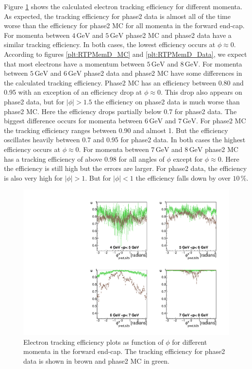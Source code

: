 \documentclass[a4paper,11pt,twosided,final,german,openbib,pdftex,listof=totoc,bibliography=totoc]{scrbook}
\begin{document}
Figure \ref{plt:xPMPhiemFC} shows the calculated electron tracking efficiency for different momenta. As expected, the tracking efficiency for phase2 data is almost all of the time worse than the efficiency for phase2 MC for all momenta in the forward end-cap. For momenta between $4\,\textrm{GeV}$ and $5\,\textrm{GeV}$ phase2 MC and phase2 data have a similar tracking efficiency. In both cases, the lowest efficiency occurs at $\phi \approx 0$. According to figures \ref{plt:RTPMemD_MC} and \ref{plt:RTPMemD_Data}, we expect that most electrons have a momentum between $5\,\textrm{GeV}$ and $8\,\textrm{GeV}$. For momenta between $5\,\textrm{GeV}$ and $6\,\textrm{GeV}$ phase2 data and phase2 MC have some differences in the calculated tracking efficiency. Phase2 MC has an efficiency between 0.80 and 0.95 with an exception of an efficiency drop at $\phi \approx 0$. This drop also appears on phase2 data, but for $|\phi| > 1.5$ the efficiency on phase2 data is much worse than phase2 MC. Here the efficiency drops partially below 0.7 for phase2 data.
The biggest difference occurs for momenta between $6\,\textrm{GeV}$ and $7\,\textrm{GeV}$. For phase2 MC the tracking efficiency ranges between 0.90 and almost 1. But the efficiency oscillates heavily between 0.7 and 0.95 for phase2 data. In both cases the highest efficiency occurs at $\phi \approx 0$. 
For momenta between $7\,\textrm{GeV}$ and $8\,\textrm{GeV}$ phase2 MC has a tracking efficiency of above 0.98 for all angles of $\phi$ except for $\phi \approx 0$. Here the efficiency is still high but the errors are larger. For phase2 data, the efficiency is also very high for $|\phi| > 1$. But for $|\phi| < 1$ the efficiency falls down by over $10\,\%$.

\begin{figure}[!htbp]
	\centering
	\includegraphics[width=\textwidth]{Plots/master/xPMPhiemFC}
	\caption[Momentum $\phi$ Electron Forward End-Cap Efficiency Phase2]{Electron tracking efficiency plots as function of $\phi$ for different momenta in the forward end-cap. The tracking efficiency for phase2 data is shown in brown and phase2 MC in green.}
		\label{plt:xPMPhiemFC}
\end{figure}
\end{document}
